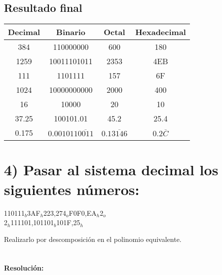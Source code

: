\documentclass[12pt]{article}
\begin{document}
\subsection*{Resultado final}

\begin{center}
\begin{tabular}{|c|c|c|c|}
\hline
\textbf{Decimal} & \textbf{Binario} & \textbf{Octal} & \textbf{Hexadecimal} \\
\hline
384 & 110000000 & 600 & 180 \\
1259 & 10011101011 & 2353 & 4EB \\
111 & 1101111 & 157 & 6F \\
1024 & 10000000000 & 2000 & 400 \\
16 & 10000 & 20 & 10 \\
37.25 & 100101.01 & 45.2 & 25.4 \\
0.175 & \(0.001011\overline{0011}\) & \(0.1\overline{3146}\) & \(0.2\overline{C}\) \\
\hline
\end{tabular}
\end{center}

\section*{4) Pasar al sistema decimal los siguientes números:}
\begin{center}
110111$_b$\hspace{1cm}3AF$_h$\hspace{1cm}223{,}274$_o$\hspace{1cm}F0F0{,}EA$_h$\hspace{1cm}2$_o$\\
2$_h$\hspace{1cm}111101{,}101101$_b$\hspace{1cm}101F{,}25$_h$
\end{center}

Realizarlo por descomposición en el polinomio equivalente.\\\\\\

\textbf{Resolución:} \\
\end{document}
